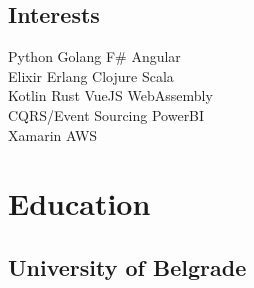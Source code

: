 \documentclass[letterpaper]{deedy-resume} %
\begin{document}
\begin{minipage}[t]{0.33\textwidth}
\subsection{Interests}

Python \textbullet{} Golang \textbullet{} F\# \textbullet{} Angular\\ 
Elixir \textbullet{} Erlang \textbullet{} Clojure \textbullet{} Scala\\
Kotlin \textbullet{} Rust \textbullet{} VueJS \textbullet{} WebAssembly\\
CQRS/Event Sourcing \textbullet{} PowerBI\\
Xamarin \textbullet{} AWS

\sectionspace %


\section{Education} 

\subsection{University of Belgrade}


\sectionspace %


\sectionspace %


\end{minipage} %
\hfill
%
%
\end{document}
